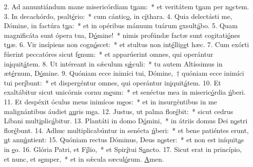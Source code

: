 2. Ad annuntiándum mane misericórdiam t\uline{u}am:~* et veritátem t\uline{u}am per n\uline{o}ctem.
3. In decachórdo, psalt\uline{é}rio:~* cum cántic\uline{o}, in c\uline{í}thara.
4. Quia delectásti me, Dómine, in factúra t\uline{u}a:~* et in opéribus mánuum tuárum \uline{e}xsult\uline{á}bo.
5. Quam magnificáta sunt ópera tua, D\uline{ó}mine!~* nimis profúndæ factæ sunt cogitati\uline{ó}nes t\uline{u}æ.
6. Vir insípiens non cogn\uline{ó}scet:~* et stultus non int\uline{é}llig\uline{e}t hæc.
7. Cum exórti fúerint peccatóres sicut f\uline{e}num:~* et apparúerint omnes, qui operántur in\uline{i}quit\uline{á}tem.
8. Ut intéreant in sǽculum s\uline{ǽ}culi:~* tu autem Altíssimus in æt\uline{é}rnum, D\uline{ó}mine.
9. Quóniam ecce inimíci tui, Dómine,~† quóniam ecce inimíci tui per\uline{í}bunt:~* et dispergéntur omnes, qui operántur in\uline{i}quit\uline{á}tem.
10. Et exaltábitur sicut unicórnis cornu m\uline{e}um:~* et senéctus mea in miseric\uline{ó}rdia \uline{ú}beri.
11. Et despéxit óculus meus inimícos m\uline{e}os:~* et in insurgéntibus in me malignántibus áudiet \uline{au}ris m\uline{e}a.
12. Justus, ut palma flor\uline{é}bit:~* sicut cedrus Líbani mult\uline{i}plic\uline{á}bitur.
13. Plantáti in domo D\uline{ó}mini,~* in átriis domus Dei n\uline{o}stri flor\uline{é}bunt.
14. Adhuc multiplicabúntur in senécta \uline{ú}beri:~* et bene patiéntes erunt, \uline{u}t ann\uline{ú}ntient:
15. Quóniam rectus Dóminus, Deus n\uline{o}ster:~* et non est iníquit\uline{a}s in \uline{e}o.
16. Glória Patri, et F\uline{í}lio,~* et Spir\uline{í}tui S\uline{a}ncto.
17. Sicut erat in princípio, et nunc, et s\uline{e}mper,~* et in sǽcula sæcul\uline{ó}rum. \uline{A}men.
